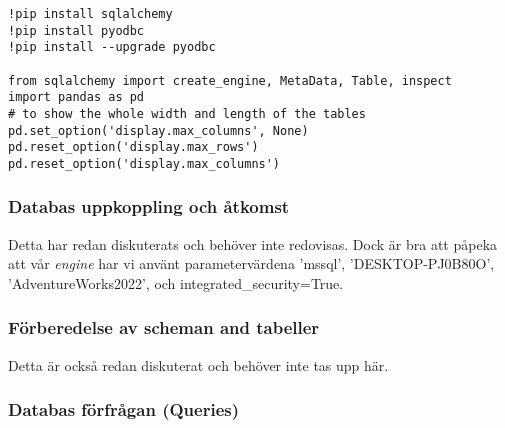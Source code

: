 \documentclass[]{article}
\begin{document}
\begin{lstlisting}
!pip install sqlalchemy
!pip install pyodbc
!pip install --upgrade pyodbc

from sqlalchemy import create_engine, MetaData, Table, inspect
import pandas as pd
# to show the whole width and length of the tables
pd.set_option('display.max_columns', None)
pd.reset_option('display.max_rows')
pd.reset_option('display.max_columns')
\end{lstlisting}

\subsubsection{Databas uppkoppling och åtkomst}

Detta har redan diskuterats och behöver inte redovisas. Dock är bra att påpeka att vår \emph{engine} har vi använt parametervärdena 'mssql', 'DESKTOP-PJ0B80O', 'AdventureWorks2022', och integrated\_security=True.

\subsubsection{Förberedelse av scheman and tabeller}
 
 Detta är också redan diskuterat och behöver inte tas upp här.

\subsubsection{Databas förfrågan (Queries)}
\end{document}
